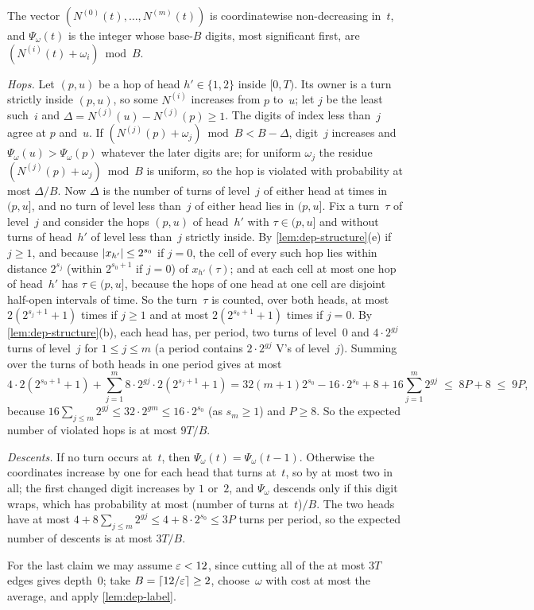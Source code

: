 \begin{informalproof}
The vector $(N^{(0)}(t),\dots,N^{(m)}(t))$ is coordinatewise non-decreasing in~$t$, and $\Psi_\omega(t)$ is the integer
whose base-$B$ digits, most significant first, are $(N^{(i)}(t)+\omega_i)\bmod B$.

\emph{Hops.} Let $(p,u)$ be a hop of head $h'\in\{1,2\}$ inside $[0,T)$. Its owner is a turn strictly inside $(p,u)$,
so some $N^{(i)}$ increases from $p$ to~$u$; let $j$ be the least such~$i$ and $\Delta=N^{(j)}(u)-N^{(j)}(p)\ge1$. The
digits of index less than~$j$ agree at $p$ and~$u$. If $(N^{(j)}(p)+\omega_j)\bmod B<B-\Delta$, digit~$j$ increases and
$\Psi_\omega(u)>\Psi_\omega(p)$ whatever the later digits are; for uniform $\omega_j$ the residue
$(N^{(j)}(p)+\omega_j)\bmod B$ is uniform, so the hop is violated with probability at most $\Delta/B$. Now $\Delta$ is
the number of turns of level~$j$ of either head at times in $(p,u]$, and no turn of level less than~$j$ of either head
lies in $(p,u]$. Fix a turn~$\tau$ of level~$j$ and consider the hops $(p,u)$ of head~$h'$ with $\tau\in(p,u]$ and
without turns of head~$h'$ of level less than~$j$ strictly inside. By \cref{lem:dep-structure}(e) if $j\ge1$, and
because $\lvert x_{h'} \rvert\le2^{s_0}$ if $j=0$, the cell of every such hop lies within distance $2^{s_j}$ (within
$2^{s_0+1}$ if $j=0$) of $x_{h'}(\tau)$; and at each cell at most one hop of head~$h'$ has $\tau\in(p,u]$, because the
hops of one head at one cell are disjoint half-open intervals of time. So the turn~$\tau$ is counted, over both
heads, at most $2(2^{s_j+1}+1)$ times if $j\ge1$ and at most $2(2^{s_0+1}+1)$ times if $j=0$. By
\cref{lem:dep-structure}(b), each head has, per period, two turns of level~$0$ and $4\cdot2^{gj}$ turns of level~$j$
for $1\le j\le m$ (a period contains $2\cdot2^{gj}$ V's of level~$j$). Summing over the turns of both heads in one
period gives at most
\[
  4\cdot2(2^{s_0+1}+1)+\sum_{j=1}^{m}8\cdot2^{gj}\cdot2(2^{s_j+1}+1)
  =32(m+1)2^{s_0}-16\cdot2^{s_0}+8+16\sum_{j=1}^m2^{gj}\;\le\;8P+8\;\le\;9P,
\]
because $16\sum_{j\le m}2^{gj}\le32\cdot2^{gm}\le16\cdot2^{s_0}$ (as $s_m\ge1$) and $P\ge8$. So the expected number of
violated hops is at most $9T/B$.

\emph{Descents.} If no turn occurs at~$t$, then $\Psi_\omega(t)=\Psi_\omega(t-1)$. Otherwise the coordinates increase
by one for each head that turns at~$t$, so by at most two in all; the first changed digit increases by $1$ or~$2$, and
$\Psi_\omega$ descends only if this digit wraps, which has probability at most (number of turns at~$t$)$/B$. The two
heads have at most
$4+8\sum_{j\le m}2^{gj}\le4+8\cdot2^{s_0}\le3P$ turns per period, so the expected number of descents is at most
$3T/B$.

For the last claim we may assume $\varepsilon<12$, since cutting all of the at most $3T$ edges gives depth~$0$; take
$B=\lceil12/\varepsilon\rceil\ge2$, choose~$\omega$ with cost at most the average, and apply
\cref{lem:dep-label}.
\end{informalproof}

